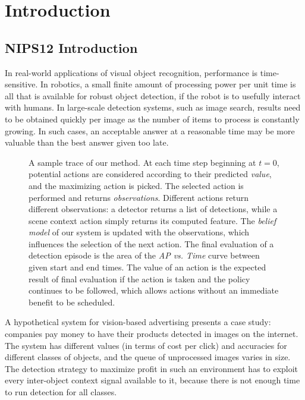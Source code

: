 \chapter{Introduction}

\section{NIPS12 Introduction} \label{sec:nips12_introduction}

In real-world applications of visual object recognition, performance is time-sensitive.
In robotics, a small finite amount of processing power per unit time is all that is available for robust object detection, if the robot is to usefully interact with humans.
In large-scale detection systems, such as image search, results need to be obtained quickly per image as the number of items to process is constantly growing.
In such cases, an acceptable answer at a reasonable time may be more valuable than the best answer given too late.

\begin{figure}[ht!]
  \caption{
A sample trace of our method.
At each time step beginning at $t=0$, potential actions are considered according to their predicted \emph{value}, and the maximizing action is picked.
The selected action is performed and returns \emph{observations}.
Different actions return different observations: a detector returns a list of detections, while a scene context action simply returns its computed feature.
The \emph{belief model} of our system is updated with the observations, which influences the selection of the next action.
The final evaluation of a detection episode is the area of the \emph{AP vs. Time} curve between given start and end times.
The value of an action is the expected result of final evaluation if the action is taken and the policy continues to be followed, which allows actions without an immediate benefit to be scheduled.
}
  \label{fig:figure1}
\end{figure}

A hypothetical system for vision-based advertising presents a case study: companies pay money to have their products detected in images on the internet.
The system has different values (in terms of cost per click) and accuracies for different classes of objects, and the queue of unprocessed images varies in size.
The detection strategy to maximize profit in such an environment has to exploit every inter-object context signal available to it, because there is not enough time to run detection for all classes.

